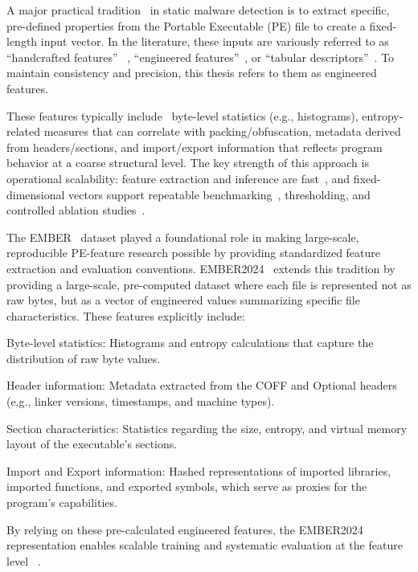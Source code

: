 \documentclass[conference]{IEEEtran}
\begin{document}
A major practical tradition~\cite{HP20182018} in static malware detection is to extract specific, pre-defined properties from the Portable Executable (PE) file to create a fixed-length input vector. In the literature, these inputs are variously referred to as “handcrafted features”~\cite{MT2025} \cite{EDS2020}, “engineered features”~\cite{HP20182018}, or “tabular descriptors”~\cite{JMGPR2024}. To maintain consistency and precision, this thesis refers to them as engineered features.

These features typically include~\cite{KBSSSK2025} byte-level statistics (e.g., histograms), entropy-related measures that can correlate with packing/obfuscation, metadata derived from headers/sections, and import/export information that reflects program behavior at a coarse structural level. The key strength of this approach is operational scalability: feature extraction and inference are fast~\cite{EDS2020}, and fixed-dimensional vectors support repeatable benchmarking~\cite{JMGPR2024}, thresholding, and controlled ablation studies~\cite{AQPWPWCR2022}.

The EMBER~\cite{HP20182018} dataset played a foundational role in making large-scale, reproducible PE-feature research possible by providing standardized feature extraction and evaluation conventions. EMBER2024~\cite{JMGPR2024} extends this tradition by providing a large-scale, pre-computed dataset where each file is represented not as raw bytes, but as a vector of engineered values summarizing specific file characteristics. These features explicitly include:

Byte-level statistics: Histograms and entropy calculations that capture the distribution of raw byte values.

Header information: Metadata extracted from the COFF and Optional headers (e.g., linker versions, timestamps, and machine types).

Section characteristics: Statistics regarding the size, entropy, and virtual memory layout of the executable’s sections.

Import and Export information: Hashed representations of imported libraries, imported functions, and exported symbols, which serve as proxies for the program’s capabilities.

By relying on these pre-calculated engineered features, the EMBER2024 representation enables scalable training and systematic evaluation at the feature level~\cite{JMGPR2024} \cite{HP20182018}.
\end{document}
